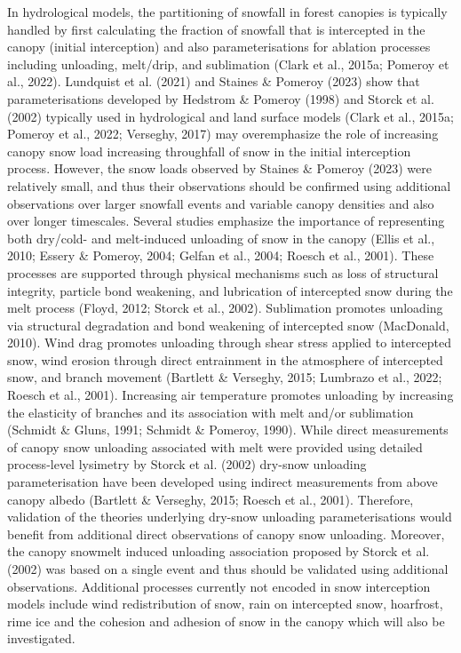 \documentclass[
  letterpaper,
]{tex/uofsthesis-cs}
\begin{document}
In hydrological models, the partitioning of snowfall in forest canopies
is typically handled by first calculating the fraction of snowfall that
is intercepted in the canopy (initial interception) and also
parameterisations for ablation processes including unloading, melt/drip,
and sublimation (Clark et al., 2015a; Pomeroy et al., 2022). Lundquist
et al. (2021) and Staines \& Pomeroy (2023) show that parameterisations
developed by Hedstrom \& Pomeroy (1998) and Storck et al. (2002)
typically used in hydrological and land surface models (Clark et al.,
2015a; Pomeroy et al., 2022; Verseghy, 2017) may overemphasize the role
of increasing canopy snow load increasing throughfall of snow in the
initial interception process. However, the snow loads observed by
Staines \& Pomeroy (2023) were relatively small, and thus their
observations should be confirmed using additional observations over
larger snowfall events and variable canopy densities and also over
longer timescales. Several studies emphasize the importance of
representing both dry/cold- and melt-induced unloading of snow in the
canopy (Ellis et al., 2010; Essery \& Pomeroy, 2004; Gelfan et al.,
2004; Roesch et al., 2001). These processes are supported through
physical mechanisms such as loss of structural integrity, particle bond
weakening, and lubrication of intercepted snow during the melt process
(Floyd, 2012; Storck et al., 2002). Sublimation promotes unloading via
structural degradation and bond weakening of intercepted snow
(MacDonald, 2010). Wind drag promotes unloading through shear stress
applied to intercepted snow, wind erosion through direct entrainment in
the atmosphere of intercepted snow, and branch movement (Bartlett \&
Verseghy, 2015; Lumbrazo et al., 2022; Roesch et al., 2001). Increasing
air temperature promotes unloading by increasing the elasticity of
branches and its association with melt and/or sublimation (Schmidt \&
Gluns, 1991; Schmidt \& Pomeroy, 1990). While direct measurements of
canopy snow unloading associated with melt were provided using detailed
process-level lysimetry by Storck et al. (2002) dry-snow unloading
parameterisation have been developed using indirect measurements from
above canopy albedo (Bartlett \& Verseghy, 2015; Roesch et al., 2001).
Therefore, validation of the theories underlying dry-snow unloading
parameterisations would benefit from additional direct observations of
canopy snow unloading. Moreover, the canopy snowmelt induced unloading
association proposed by Storck et al. (2002) was based on a single event
and thus should be validated using additional observations. Additional
processes currently not encoded in snow interception models include wind
redistribution of snow, rain on intercepted snow, hoarfrost, rime ice
and the cohesion and adhesion of snow in the canopy which will also be
investigated.
\end{document}
